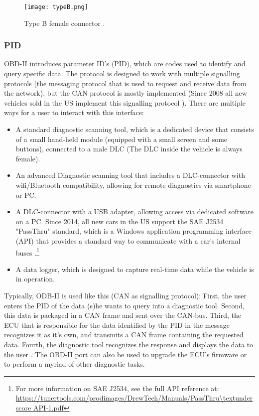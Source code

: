 \begin{figure}[h]
	\centering
	\texttt{[image: typeB.png]}
	\caption{Type B female connector \cite{wiki:OBD}.}
	\label{fig:typeB}
\end{figure}

\subsubsection{PID}
\label{subsec:obd:pid}

OBD-II introduces parameter ID's (PID), which are codes used to identify and query specific data. The protocol is designed to work with multiple signalling protocols (the messaging protocol that is used to request and receive data from the network), but the CAN protocol is mostly implemented (Since 2008 all new vehicles sold in the US implement this signalling protocol \cite{OBDconnector}). \newline
\newline
There are multiple ways for a user to interact with this interface:
\begin{itemize}
	\item A standard diagnostic scanning tool, which is a dedicated device that consists of a small hand-held module (equipped with a small screen and some buttons), connected to a male DLC (The DLC inside the vehicle is always female).
	
	\item An advanced Diagnostic scanning tool that includes a DLC-connector with wifi/Bluetooth compatibility, allowing for remote diagnostics via smartphone or PC.
	
	\item A DLC-connector with a USB adapter, allowing access via dedicated software on a PC. Since 2014, all new cars in the US support the SAE J2534 "PassThru" standard, which is a Windows application programming interface (API) that provides a standard way to communicate with a car's internal buses \cite{Kosher}.\footnote{For more information on SAE J2534, see the full API reference at: \url{https://tunertools.com/prodimages/DrewTech/Manuals/PassThru\textunderscore API-1.pdf}}
	
	\item A data logger, which is designed to capture real-time data while the vehicle is in operation.
\end{itemize}
Typically, ODB-II is used like this (CAN as signalling protocol): First, the user enters the PID of the data (s)he wants to query into a diagnostic tool. Second, this data is packaged in a CAN frame and sent over the CAN-bus. Third, the ECU that is responsible for the data identified by the PID in the message recognizes it as it's own, and transmits a CAN frame containing the requested data. Fourth, the diagnostic tool recognizes the response and displays the data to the user \cite{wiki:PID}. The OBD-II port can also be used to upgrade the ECU's firmware or to perform a myriad of other diagnostic tasks.

